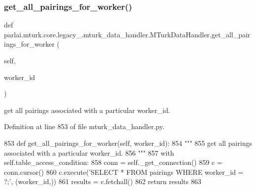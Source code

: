 \subsubsection{\texorpdfstring{get\+\_\+all\+\_\+pairings\+\_\+for\+\_\+worker()}{get\_all\_pairings\_for\_worker()}}
{\footnotesize\ttfamily def parlai.\+mturk.\+core.\+legacy\+\_.\+mturk\+\_\+data\+\_\+handler.\+M\+Turk\+Data\+Handler.\+get\+\_\+all\+\_\+pairings\+\_\+for\+\_\+worker (\begin{DoxyParamCaption}\item[{}]{self,  }\item[{}]{worker\+\_\+id }\end{DoxyParamCaption})}

\begin{DoxyVerb}get all pairings associated with a particular worker_id.
\end{DoxyVerb}
 

Definition at line 853 of file mturk\+\_\+data\+\_\+handler.\+py.


\begin{DoxyCode}
853     \textcolor{keyword}{def }get\_all\_pairings\_for\_worker(self, worker\_id):
854         \textcolor{stringliteral}{"""}
855 \textcolor{stringliteral}{        get all pairings associated with a particular worker\_id.}
856 \textcolor{stringliteral}{        """}
857         with self.table\_access\_condition:
858             conn = self.\_get\_connection()
859             c = conn.cursor()
860             c.execute(\textcolor{stringliteral}{'SELECT * FROM pairings WHERE worker\_id = ?;'}, (worker\_id,))
861             results = c.fetchall()
862             \textcolor{keywordflow}{return} results
863 
\end{DoxyCode}
\mbox{\label{classparlai_1_1mturk_1_1core_1_1legacy__2018_1_1mturk__data__handler_1_1MTurkDataHandler_a73a79c0e3a769cdc1803e2c44ea47d65}} 
